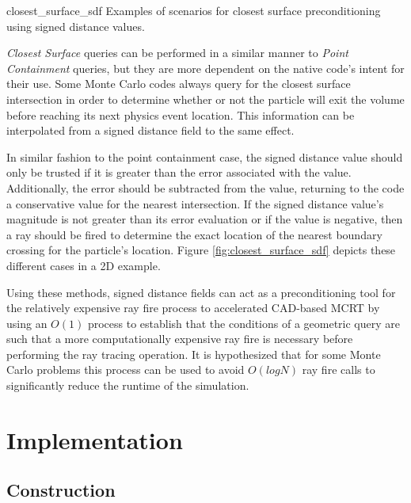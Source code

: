              {closest_surface_sdf}
             {Examples of scenarios for closest surface preconditioning using signed distance values.}
             {
               \textit{Closest Surface} queries can be performed in a similar manner to
               \textit{Point Containment} queries, but they are more dependent on the
               native code's intent for their use. Some Monte Carlo codes always
               query for the closest surface intersection in order to
               determine whether or not the particle will exit the volume before
               reaching its next physics event location. This information can be
               interpolated from a signed distance field to the same effect.
               
               In similar fashion to the point containment case, the signed
               distance value should only be trusted if it is greater than the
               error associated with the value. Additionally, the error should
               be subtracted from the value, returning to the code a
               conservative value for the nearest intersection. If the signed
               distance value's magnitude is not greater than its error
               evaluation or if the value is negative, then a ray should be
               fired to determine the exact location of the nearest boundary
               crossing for the particle's location. Figure
               \ref{fig:closest_surface_sdf} depicts these different cases in a
               2D example.
             }
             
Using these methods, signed distance fields can act as a preconditioning tool
for the relatively expensive ray fire process to accelerated CAD-based MCRT by
using an $O(1)$ process to establish that the conditions of a geometric query
are such that a more computationally expensive ray fire is necessary before
performing the ray tracing operation. It is hypothesized that for some Monte
Carlo problems this process can be used to avoid $O(logN)$ ray fire calls to
significantly reduce the runtime of the simulation.

\section{Implementation}

\subsection{Construction}

